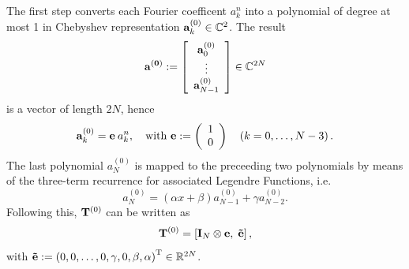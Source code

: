 The first step converts each Fourier coefficent $a_{k}^n$ into a polynomial of degree at most 1 in Chebyshev representation $\mathbf{a}_{k}^{(0)} \in \mathbb{C}^2$. The result 
\[
  \mathbf{a^{(0)}} := 
    \left[\begin{array}{c}
      \mathbf{a}_{0}^{(0)}\\
      \vdots\\
      \mathbf{a}_{N-1}^{(0)}
    \end{array}\right] 
    \in \mathbb{C}^{2N}
\] 
is a vector of length $2N$, hence 
\[ 
  \mathbf{a}_{k}^{(0)} = \mathbf{e} \: a_{k}^n,\quad \text{with } \mathbf{e} := \left(\begin{array}{l}1\\0\end{array}\right) \quad \left(k = 0,\ldots,N-3\right).
\]
The last polynomial $a_{N}^{(0)}$ is mapped to the preceeding two polynomials by means of the three-term recurrence for associated Legendre Functions, 
i.e. 
\[
  a_{N}^{(0)} = \left(\alpha x + \beta\right)a_{N-1}^{(0)} + \gamma a_{N-2}^{(0)}.
\]
Following this, $\mathbf{T}^{(0)}$ can be written as 
\[
  \mathbf{T}^{(0)} = \left[\mathbf{I}_{N} \otimes \mathbf{e},\;\mathbf{\tilde{e}}\right],
\]
with $\mathbf{\tilde{e}} := \left(0,0,\dots,0,\gamma, 0, \beta,\alpha\right)^{\text{\rm{T}}} \in \mathbb{R}^{2N}$.

